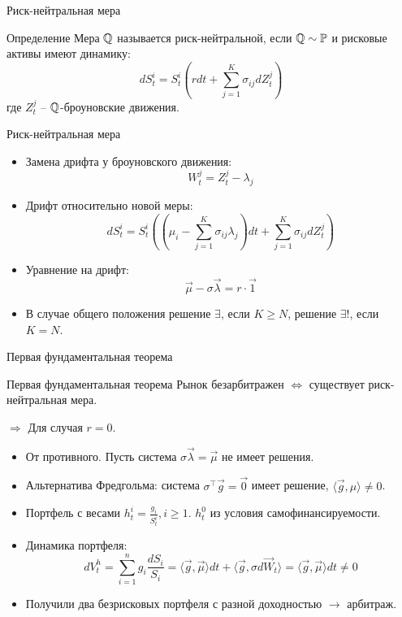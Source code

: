 \documentclass[aspectratio=169]{beamer}
\begin{document}
\begin{frame}{Риск-нейтральная мера}
    \begin{block}{Определение}
        Мера $\mathbb{Q}$ называется риск-нейтральной, если $\mathbb{Q} \sim \mathbb{P}$ и рисковые активы имеют динамику:
        $$
            dS^i_t = S^i_t \left( r dt  + \sum_{j=1}^K \sigma_{ij} dZ_t^j \right)
        $$где $Z_t^j$ -- $\mathbb{Q}$-броуновские движения.
    \end{block}
\end{frame}

\begin{frame}{Риск-нейтральная мера}
    \begin{itemize}
        \item Замена дрифта у броуновского движения:
        $$
            W_t^j = Z_t^j - \lambda_j
        $$
        \item Дрифт относительно новой меры:
        $$
            dS^i_t = S^i_t \left( (\mu_i - \sum_{j=1}^K \sigma_{ij} \lambda_j) dt  + \sum_{j=1}^K \sigma_{ij} dZ_t^j \right)
        $$
        \item Уравнение на дрифт:
        $$
            \vec{\mu} - \sigma \vec{\lambda} = r \cdot \vec{1}
        $$
        \item В случае общего положения решение $\exists$, если $K \geq N$, решение $\exists!$, если $K=N$.
    \end{itemize}
\end{frame}

\begin{frame}{Первая фундаментальная теорема}
    \begin{block}{Первая фундаментальная теорема}
        Рынок безарбитражен $\Leftrightarrow$ существует риск-нейтральная мера.
    \end{block}
    \pause 
    $\Rightarrow$ Для случая $r=0$.
    \begin{itemize}
        \item От противного. Пусть система $\sigma \vec{\lambda} = \vec{\mu}$ не имеет решения.
        \item Альтернатива Фредгольма: система $\sigma^{\top} \vec{g} = \vec{0}$ имеет решение, $\langle \vec{g}, \mu \rangle \neq 0$.
        \item Портфель с весами $h_t^i = \frac{g_i}{S_t^i}, i \geq 1$. $h_t^0$ из условия самофинансируемости.
        \item Динамика портфеля:
        $$
            dV^h_t = \sum_{i=1}^n g_i \frac{dS_i}{S_i}
            = \langle \vec{g}, \vec{\mu} \rangle dt + 
            \langle \vec{g}, \hat{\sigma} d\vec{W}_t \rangle = 
            \langle \vec{g}, \vec{\mu} \rangle dt \neq 0
        $$ 
        \item Получили два безрисковых портфеля с разной доходностью $\to$ арбитраж.
    \end{itemize}
\end{frame}
\end{document}
